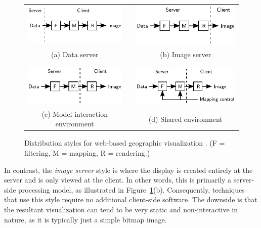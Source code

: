 \documentclass[acmnow]{acmtrans2m}
\begin{document}
\begin{figure}
	\centering
	\begin{tabular}{ccc}
		\includegraphics[scale=0.9]{data_server}	&
		\qquad	&
		\includegraphics[scale=0.9]{image_server}	\\
		\footnotesize (a) Data server	&
		\qquad	&
		\footnotesize (b) Image server	\\
		\\
		\\
		\includegraphics[scale=0.9]{model_interaction}	&
		\qquad	&
		\includegraphics[scale=0.9]{shared}	\\
		\footnotesize (c) Model interaction environment	&
		\qquad	&
		\footnotesize (d) Shared environment	\\
	\end{tabular}
	\caption{Distribution styles for web-based geographic visualization
	\protect\cite{Wood-J-1996-vis}. (F = filtering, M = mapping, R =
	rendering.)}
	\label{fig-distribution-styles}
\end{figure}


In contrast, the \emph{image server} style is where the display is
created entirely at the server and is only viewed at the client. In
other words, this is primarily a server-side processing model, as
illustrated in Figure~\ref{fig-distribution-styles}(b). Consequently,
techniques that use this style require no additional client-side
software. The downside is that the resultant visualization can tend to
be very static and non-interactive in nature, as it is typically just a
simple bitmap image.
\end{document}
